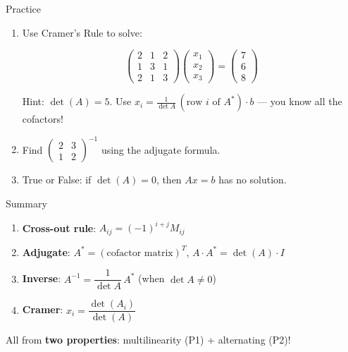 \documentclass[10pt]{beamer}
\theoremstyle{definition}
\newcommand{\x}[1]{\alert{\textbf{#1}}}
\begin{document}
\begin{frame}{Practice}

\begin{enumerate}
\item Use Cramer's Rule to solve:

$$\begin{pmatrix}2&1&2\\1&3&1\\2&1&3\end{pmatrix}\begin{pmatrix}x_1\\x_2\\x_3\end{pmatrix} = \begin{pmatrix}7\\6\\8\end{pmatrix}$$

{\footnotesize Hint: $\det(A) = 5$. Use $x_i = \frac{1}{\det A}\,(\text{row }i\text{ of }A^*)\cdot b$ --- you know all the cofactors!}

\vfill

\item Find $\begin{pmatrix}2&3\\1&2\end{pmatrix}^{-1}$ using the adjugate formula.

\vfill

\item True or False: if $\det(A) = 0$, then $Ax = b$ has no solution.
\end{enumerate}

\end{frame}


\begin{frame}{Summary}

\begin{enumerate}
\item \textbf{Cross-out rule}: $A_{ij} = (-1)^{i+j} M_{ij}$

\item \textbf{Adjugate}: $A^* = (\text{cofactor matrix})^T$, \quad $A \cdot A^* = \det(A) \cdot I$

\item \textbf{Inverse}: $A^{-1} = \dfrac{1}{\det A}\, A^*$ \quad (when $\det A \neq 0$)

\item \textbf{Cramer}: $x_i = \dfrac{\det(A_i)}{\det(A)}$
\end{enumerate}

\vfill

All from \x{two properties}: multilinearity (P1) + alternating (P2)!

\end{frame}
\end{document}
